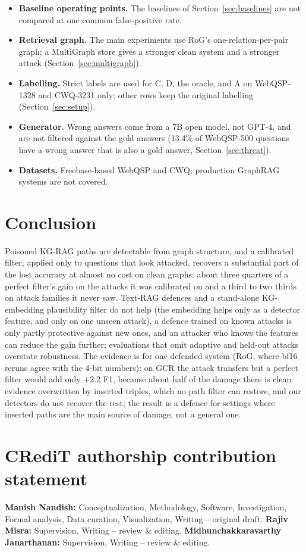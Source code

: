 \documentclass[preprint,12pt]{elsarticle}
\begin{document}
\begin{itemize}[leftmargin=*,itemsep=2pt]
\item \textbf{Baseline operating points.} The baselines of Section~\ref{sec:baselines} are not compared at one common false-positive rate.
\item \textbf{Retrieval graph.} The main experiments use RoG's one-relation-per-pair graph; a MultiGraph store gives a stronger clean system and a stronger attack (Section~\ref{sec:multigraph}).
\item \textbf{Labelling.} Strict labels are used for C, D, the oracle, and A on WebQSP-1328 and CWQ-3231 only; other rows keep the original labelling (Section~\ref{sec:setup}).
\item \textbf{Generator.} Wrong answers come from a 7B open model, not GPT-4, and are not filtered against the gold answers (13.4\% of WebQSP-500 questions have a wrong answer that is also a gold answer, Section~\ref{sec:threat}).
\item \textbf{Datasets.} Freebase-based WebQSP and CWQ; production GraphRAG systems are not covered.
\end{itemize}

\section{Conclusion}
Poisoned KG-RAG paths are detectable from graph structure, and a calibrated filter, applied only to questions that look attacked, recovers a substantial part of the lost accuracy at almost no cost on clean graphs: about three quarters of a perfect filter's gain on the attacks it was calibrated on and a third to two thirds on attack families it never saw. Text-RAG defences and a stand-alone KG-embedding plausibility filter do not help (the embedding helps only as a detector feature, and only on one unseen attack), a defence trained on known attacks is only partly protective against new ones, and an attacker who knows the features can reduce the gain further; evaluations that omit adaptive and held-out attacks overstate robustness. The evidence is for one defended system (RoG, where bf16 reruns agree with the 4-bit numbers): on GCR the attack transfers but a perfect filter would add only $+$2.2 F1, because about half of the damage there is clean evidence overwritten by inserted triples, which no path filter can restore, and our detectors do not recover the rest; the result is a defence for settings where inserted paths are the main source of damage, not a general one.

\section*{CRediT authorship contribution statement}
\textbf{Manish Nandish:} Conceptualization, Methodology, Software, Investigation, Formal analysis, Data curation, Visualization, Writing -- original draft.
\textbf{Rajiv Misra:} Supervision, Writing -- review \& editing.
\textbf{Midhunchakkaravarthy Janarthanan:} Supervision, Writing -- review \& editing.
\end{document}
